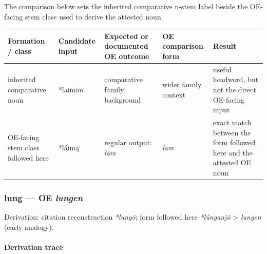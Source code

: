 \documentclass[
  british,
  a4paper,
]{article}
\newcounter{none} %
\begin{document}
The comparison below sets the inherited comparative n-stem label beside
the OE-facing stem class used to derive the attested noun.

{\def\LTcaptype{none} %
\begin{longtable}[]{@{}
  >{\raggedright\arraybackslash}p{}
  >{\raggedright\arraybackslash}p{}
  >{\raggedright\arraybackslash}p{}
  >{\raggedright\arraybackslash}p{}
  >{\raggedright\arraybackslash}p{}@{}}
\toprule\noalign{}
\begin{minipage}[b]{\linewidth}\raggedright
Formation / class
\end{minipage} & \begin{minipage}[b]{\linewidth}\raggedright
Candidate input
\end{minipage} & \begin{minipage}[b]{\linewidth}\raggedright
Expected or documented OE outcome
\end{minipage} & \begin{minipage}[b]{\linewidth}\raggedright
OE comparison form
\end{minipage} & \begin{minipage}[b]{\linewidth}\raggedright
Result
\end{minipage} \\
\midrule\noalign{}
\endhead
\bottomrule\noalign{}
\endlastfoot
inherited comparative noun & *laimōn & comparative family background &
wider family context & useful headword, but not the direct OE-facing
input \\
OE-facing stem class followed here & *láimą & regular output: \emph{lām}
& \emph{lām} & exact match between the form followed here and the
attested OE noun \\
\end{longtable}
}

\subsubsection{\texorpdfstring{lung --- OE
\emph{lungen}}{lung --- OE lungen}}\label{lung-oe-lungen}

Derivation: citation reconstruction \emph{*lungō}; form followed here
\emph{*lúnganjō} \textgreater{} \emph{lungen} (early analogy).

\paragraph{Derivation trace}\label{derivation-trace-126}
\end{document}
